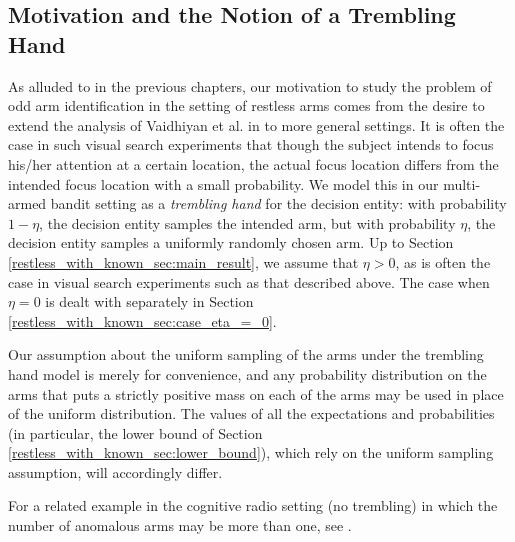 \subsection{Motivation and the Notion of a Trembling Hand}
As alluded to in the previous chapters, our motivation to study the problem of odd arm identification in the setting of restless arms comes from the desire to extend the analysis of Vaidhiyan et al. in \cite{Vaidhiyan2017, vaidhiyan2012active, vaidhiyan2017learning} to more general settings. It is often the case in such visual search experiments that though the subject intends to focus his/her attention at a certain location, the actual focus location differs from the intended focus location with a small probability. We model this in our multi-armed bandit setting as a {\em trembling hand} for the decision entity: with probability $1-\eta$, the decision entity samples the intended arm, but with probability $\eta$, the decision entity samples a uniformly randomly chosen arm. Up to Section \ref{restless_with_known_sec:main_result}, we assume that $\eta>0$, as is often the case in visual search experiments such as that described above. The case when $\eta=0$ is dealt with separately in Section \ref{restless_with_known_sec:case_eta_=_0}.

Our assumption about the uniform sampling of the arms under the trembling hand model is merely for convenience, and any probability distribution on the arms that puts a strictly positive mass on each of the arms may be used in place of the uniform distribution. The values of all the expectations and probabilities (in particular, the lower bound of Section \ref{restless_with_known_sec:lower_bound}), which rely on the uniform sampling assumption, will accordingly differ.

For a related example in the cognitive radio setting (no trembling) in which the number of anomalous arms may be more than one, see \cite{zhao2008myopic}.

